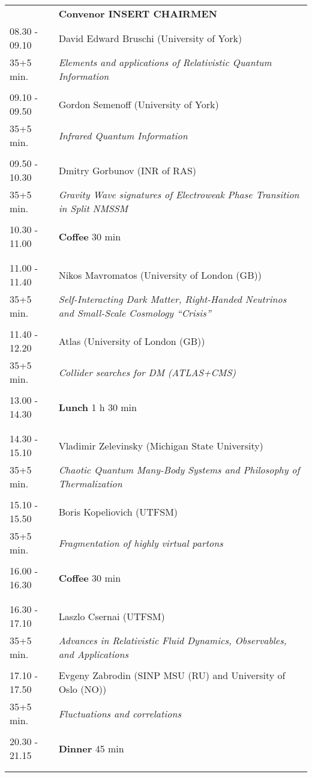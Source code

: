 \begin{longtable}{p{3cm}p{13cm}}
&\hfill {\bf Convenor INSERT CHAIRMEN }\\ 
08.30 - 09.10 & David Edward Bruschi (University of York)\\ 
35+5 min. & {\it Elements and applications of Relativistic Quantum Information}\\ 
 & \\ 
09.10 - 09.50 & Gordon Semenoff (University of York)\\ 
35+5 min. & {\it Infrared Quantum Information}\\ 
 & \\ 
09.50 - 10.30 & Dmitry Gorbunov (INR of RAS)\\ 
35+5 min. & {\it Gravity Wave signatures of Electroweak Phase Transition in Split NMSSM}\\ 
 & \\ 
10.30 - 11.00 & {\bf Coffee} \hfill 30 min \\ 
 & \\ 
 & \\ 
11.00 - 11.40 & Nikos Mavromatos (University of London (GB))\\ 
35+5 min. & {\it Self-Interacting Dark Matter, Right-Handed Neutrinos and Small-Scale Cosmology ``Crisis''}\\ 
 & \\ 
11.40 - 12.20 & Atlas (University of London (GB))\\ 
35+5 min. & {\it Collider searches for DM (ATLAS+CMS)}\\ 
 & \\ 
13.00 - 14.30 & {\bf Lunch} \hfill 1 h 30 min \\ 
 & \\ 
 & \\ 
14.30 - 15.10 & Vladimir Zelevinsky (Michigan State University)\\ 
35+5 min. & {\it Chaotic Quantum Many-Body Systems and Philosophy of Thermalization}\\ 
 & \\ 
15.10 - 15.50 & Boris Kopeliovich (UTFSM)\\ 
35+5 min. & {\it Fragmentation of highly virtual partons}\\ 
 & \\ 
16.00 - 16.30 & {\bf Coffee} \hfill 30 min \\ 
 & \\ 
 & \\ 
16.30 - 17.10 & Laszlo Csernai (UTFSM)\\ 
35+5 min. & {\it Advances in Relativistic Fluid Dynamics, Observables, and Applications}\\ 
 & \\ 
17.10 - 17.50 & Evgeny Zabrodin (SINP MSU (RU) and University of Oslo (NO))\\ 
35+5 min. & {\it Fluctuations and correlations}\\ 
 & \\ 
20.30 - 21.15 & {\bf Dinner} \hfill 45 min \\ 
 & \\ 
 & \\ 
\end{longtable}


